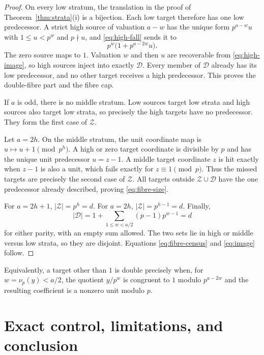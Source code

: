 \documentclass[a4paper,10pt]{amsart}
\theoremstyle{remark}
\newcommand{\vp}{\nu_p}
\begin{document}
\begin{proof}
On every low stratum, the translation in the proof of
Theorem~\ref{thm:strata}(i) is a bijection.  Each low target therefore has one
low predecessor.  A strict high source of valuation $a-w$ has the unique form
$p^{a-w}u$ with $1\leq u<p^w$ and $p\nmid u$, and \eqref{eq:high-fall} sends it
to
\begin{equation}\label{eq:high-image}
 p^w\bigl(1+p^{a-2w}u\bigr).
\end{equation}
The zero source maps to $1$.  Valuation $w$ and then $u$ are recoverable from
\eqref{eq:high-image}, so high sources inject into exactly $\mathcal D$.
Every member of $\mathcal D$ already has its low predecessor, and no other
target receives a high predecessor.  This proves the double-fibre part and
the fibre cap.

If $a$ is odd, there is no middle stratum.  Low sources target low strata and
high sources also target low strata, so precisely the high targets have no
predecessor.  They form the first case of $\mathcal Z$.

Let $a=2h$.  On the middle stratum, the unit coordinate map is
$u\mapsto u+1\pmod {p^h}$.  A high or zero target coordinate is divisible by
$p$ and has the unique unit predecessor $u=z-1$.  A middle target coordinate
$z$ is hit exactly when $z-1$ is also a unit, which fails exactly for
$z\equiv1\pmod p$.  Thus the missed targets are precisely the second case of
$\mathcal Z$.  All targets outside $\mathcal Z\cup\mathcal D$ have the one
predecessor already described, proving \eqref{eq:fibre-size}.

For $a=2h+1$, $|\mathcal Z|=p^h=d$.  For $a=2h$,
$|\mathcal Z|=p^{h-1}=d$.  Finally,
\begin{equation*}
 |\mathcal D|=1+\sum_{1\leq w<a/2}(p-1)p^{w-1}=d
\end{equation*}
for either parity, with an empty sum allowed.  The two sets lie in high or
middle versus low strata, so they are disjoint.  Equations
\eqref{eq:fibre-census} and \eqref{eq:image} follow.
\end{proof}

Equivalently, a target other than $1$ is double precisely when, for
$w=\vp(y)<a/2$, the quotient $y/p^w$ is congruent to $1$ modulo
$p^{a-2w}$ and the resulting coefficient is a nonzero unit modulo $p$.

\section{Exact control, limitations, and conclusion}
\end{document}
